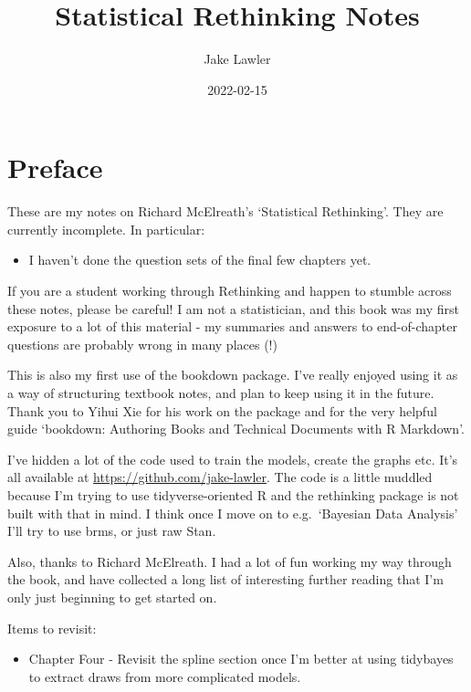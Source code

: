 \documentclass[
]{book}
\title{Statistical Rethinking Notes}
\author{Jake Lawler}
\date{2022-02-15}
\providecommand{\tightlist}{%
  \setlength{\itemsep}{0pt}\setlength{\parskip}{0pt}}
\begin{document}
\maketitle

{
\setcounter{tocdepth}{1}
\tableofcontents
}
\hypertarget{preface}{%
\chapter*{Preface}\label{preface}}

These are my notes on Richard McElreath's `Statistical Rethinking'. They are currently incomplete. In particular:

\begin{itemize}
\tightlist
\item
  I haven't done the question sets of the final few chapters yet.
\end{itemize}

If you are a student working through Rethinking and happen to stumble across these notes, please be careful! I am not a statistician, and this book was my first exposure to a lot of this material - my summaries and answers to end-of-chapter questions are probably wrong in many places (!)

This is also my first use of the bookdown package. I've really enjoyed using it as a way of structuring textbook notes, and plan to keep using it in the future. Thank you to Yihui Xie for his work on the package and for the very helpful guide `bookdown: Authoring Books and Technical Documents with R Markdown'.

I've hidden a lot of the code used to train the models, create the graphs etc. It's all available at \url{https://github.com/jake-lawler}. The code is a little muddled because I'm trying to use tidyverse-oriented R and the rethinking package is not built with that in mind. I think once I move on to e.g.~`Bayesian Data Analysis' I'll try to use brms, or just raw Stan.

Also, thanks to Richard McElreath. I had a lot of fun working my way through the book, and have collected a long list of interesting further reading that I'm only just beginning to get started on.

Items to revisit:

\begin{itemize}
\tightlist
\item
  Chapter Four - Revisit the spline section once I'm better at using tidybayes to extract draws from more complicated models.
\end{itemize}
\end{document}

